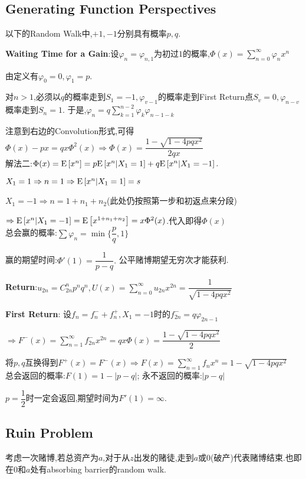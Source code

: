 \subsection{Generating Function Perspectives}
以下的Random Walk中,$ +1,-1$分别具有概率$ p,q$.

\textbf{Waiting Time for a Gain}:设$ \varphi_{n} = \varphi_{n,1}$为初过$ 1$的概率,$ \Phi(x)=\sum_{n=0}^\infty{\varphi_nx^n}$

由定义有$ \varphi_0=0,\varphi_1=p$.

对$ n>1$,必须以$q$的概率走到$ S_1 = -1,\varphi_{v-1}$的概率走到First Return点$ S_v = 0,\varphi_{n-v}$概率走到$ S_n=1$.
于是,$ \varphi_n = q\sum_{k=1}^{n-2}{\varphi_k\varphi_{n-1-k}}$

注意到右边的Convolution形式,可得$ \Phi(x)-px = qx\Phi^2(x)\Rightarrow \Phi(x) = \dfrac{1-\sqrt{1-4pqx^2}}{2qx}$
\\

解法二:$ \Phi(x) = \text{E}\left[x^n\right] = p\text{E}\left[x^n | X_1=1\right] + q\text{E}\left[x^n|X_1=-1\right].$

$X_1=1\Rightarrow n=1\Rightarrow \text{E}\left[x^n|X_1=1\right]=s$

$ X_1=-1\Rightarrow n=1+n_1+n_2$(此处仍按照第一步和初返点来分段)

$ \Rightarrow \text{E}\left[x^n|X_1=-1\right]=\text{E}\left[x^{1+n_1+n_2}\right]=x\Phi^2(x)$.代入即得$ \Phi(x)$
\\

总会赢的概率:$ \sum{\varphi_n} = \min\{\dfrac{p}{q},1\}$

赢的期望时间:$ \Phi'(1) = \dfrac{1}{p-q}.$ 公平赌博期望无穷次才能获利.
\vspace{0.6cm}

\textbf{Return}:$ u_{2n} = C_{2n}^np^nq^n,U(x) = \sum_{n=0}^\infty u_{2n}x^{2n} = \dfrac{1}{\sqrt{1-4pqx^2}}$

\textbf{First Return}:
设$f_n = f_n^{-}+f_n^+, X_1=-1$时的$ f_{2n}^- = q\varphi_{2n-1}$

$\Rightarrow F^-(x) = \sum_{n=1}^\infty f_{2n}^-x^{2n}=qx\Phi(x)=\dfrac{1-\sqrt{1-4pqx^2}}{2}$

将$ p,q$互换得到$ F^+(x)=F^-(x) \Rightarrow F(x)=\sum_{n=1}^\infty f_nx^n = 1-\sqrt{1-4pqx^2}$
\\

总会返回的概率:$ F(1) = 1-|p-q|$; 永不返回的概率:$ |p-q|$

$ p=\dfrac{1}{2}$时一定会返回,期望时间为$ F'(1)=\infty$.

\subsection{Ruin Problem}
考虑一次赌博,若总资产为$ a$,对于从$z$出发的赌徒,走到$ a$或$0$(破产)代表赌博结束.也即在$0$和$a$处有absorbing barrier的random walk.

